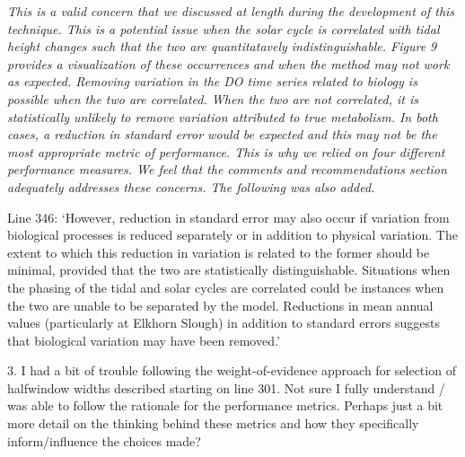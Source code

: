 \documentclass[letterpaper,12pt]{article}\usepackage[]{graphicx}\usepackage[]{color}
\begin{document}
{\it This is a valid concern that we discussed at length during the development of this technique.  This is a potential issue when the solar cycle is correlated with tidal height changes such that the two are quantitatavely indistinguishable.  Figure 9 provides a visualization of these occurrences and when the method may not work as expected.  Removing variation in the DO time series related to biology is possible when the two are correlated. When the two are not correlated, it is statistically unlikely to remove variation attributed to true metabolism.  In both cases, a reduction in standard error would be expected and this may not be the most appropriate metric of performance. This is why we relied on four different performance measures. We feel that the comments and recommendations section adequately addresses these concerns.  The following was also added.


Line 346: `However, reduction in standard error may also occur if variation from biological processes is reduced separately or in addition to physical variation.  The extent to which this reduction in variation is related to the former should be minimal, provided that the two are statistically distinguishable.  Situations when the phasing of the tidal and solar cycles are correlated could be instances when the two are unable to be separated by the model.  Reductions in mean annual values (particularly at Elkhorn Slough) in addition to standard errors suggests that biological variation may have been removed.'
}

3. I had a bit of trouble following the weight-of-evidence approach for selection of halfwindow widths described starting on line 301. Not sure I fully understand / was able to follow the rationale for the performance metrics. Perhaps just a bit more detail on the thinking behind these metrics and how they specifically inform/influence the choices made?
\end{document}
